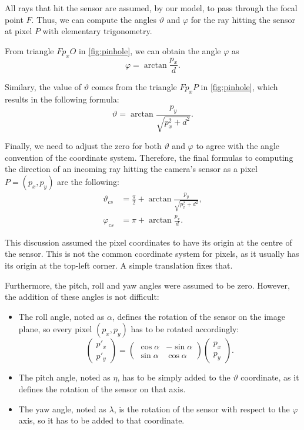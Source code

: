 All rays that hit the sensor are assumed, by our model, to pass through the focal point $F$. Thus, we can compute the angles $\vartheta$ and $\varphi$ for the ray hitting the sensor at pixel $P$ with elementary trigonometry.

From triangle $Fp_xO$ in \autoref{fig:pinhole}, we can obtain the angle $\varphi$ as
\[
\varphi = \arctan{\frac{p_x}{d}}.
\]

Similary, the value of $\vartheta$ comes from the triangle $Fp_xP$ in \autoref{fig:pinhole}, which results in the following formula:
\[
\vartheta = \arctan{\frac{p_y}{\sqrt{p_x^2 + d^2}}}.
\]

Finally, we need to adjust the zero for both $\vartheta$ and $\varphi$ to agree with the angle convention of the coordinate system. Therefore, the final formulas to computing the direction of an incoming ray hitting the camera's sensor as a pixel $P = (p_x, p_y)$ are the following:
\begin{align}
\vartheta_{cs} &= \frac{\pi}{2} + \arctan{\frac{p_y}{\sqrt{p_x^2 + d^2}}}, \\
\varphi_{cs} &= \pi + \arctan{\frac{p_x}{d}}.
\end{align}

This discussion assumed the pixel coordinates to have its origin at the centre of the sensor. This is not the common coordinate system for pixels, as it usually has its origin at the top-left corner. A simple translation fixes that.

Furthermore, the pitch, roll and yaw angles were assumed to be zero. However, the addition of these angles is not difficult:
\begin{itemize}
	\item The roll angle, noted as $\alpha$, defines the rotation of the sensor on the image plane, so every pixel $(p_x, p_y)$ has to be rotated accordingly:
	\[
	\begin{pmatrix}
	p'_x \\
	p'_y
	\end{pmatrix} = 
	\begin{pmatrix}
	\cos\alpha & -\sin\alpha \\
	\sin\alpha & \cos\alpha 
	\end{pmatrix}
	\begin{pmatrix}
	p_x \\
	p_y
	\end{pmatrix}.
	\]
	\item The pitch angle, noted as $\eta$, has to be simply added to the $\vartheta$ coordinate, as it defines the rotation of the sensor on that axis.
	\item The yaw angle, noted as $\lambda$, is the rotation of the sensor with respect to the $\varphi$ axis, so it has to be added to that coordinate.	
\end{itemize}

